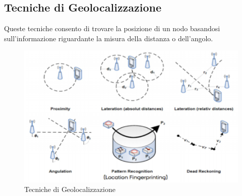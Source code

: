         \newpage

        \subsection{Tecniche di Geolocalizzazione}\label{subsec3.5}
        Queste tecniche consento di trovare la posizione di un nodo basandosi
sull'informazione riguardante la misura della distanza o dell'angolo.
        \begin{figure}
                \centering
                \includegraphics[scale=0.6]{fig5-lec3pt1.png}
                \caption{Tecniche di Geolocalizzazione}
                \label{fig:fig5-lec3pt1}
        \end{figure}

